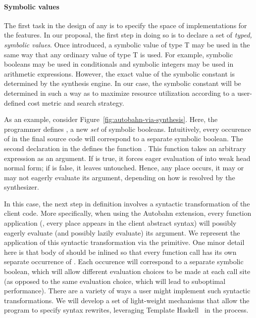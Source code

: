 \paragraph*{Symbolic values}
The first task in the design of any \rasp{} is to specify the space of
implementations for the \rasp{} features.  In our proposal, the first step
in doing so is to declare a set of \emph{typed, symbolic values}.  Once introduced, a symbolic value
of type T may be used in the same way that any ordinary value of type T is used.
For example, symbolic booleans may be used in conditionals and symbolic integers may be used
in arithmetic expressions.  However, the exact value of the symbolic constant is
determined by the synthesis engine.  In our case, the symbolic constant will be determined
in such a way as to maximize resource utilization according to a user-defined cost metric and
search strategy.

As an example, consider Figure~\ref{fig:autobahn-via-synthesis}.  Here, the programmer
defines , a new \emph{set} of symbolic booleans.  Intuitively, every occurence of 
in the final source code will correspond to a separate symbolic boolean.  The second declaration in
the \rasp{} defines the function .  This function takes an arbitrary expression 
as an argument.  If  is true, it forces eager evaluation of  into weak head normal
form; if   is false, it leaves  untouched.  Hence, any
place  occurs, it
may or may not eagerly evaluate its argument, depending on how  is resolved by the
synthesizer.

In this case, the next step in \rasp{} definition involves a syntactic
transformation of the client code.  More specifically, when using the
Autobahn extension, every function application (\ie, every place
 appears in the client abstract syntax) will possibly
eagerly evaluate (and possibly lazily evaluate) its argument.  We
represent the application of this syntactic transformation via the
 primitive.  One minor detail here is that body of
 should be inlined so that every function call has its own
separate occurrence of .  Each occurence will correspond to a
separate symbolic boolean, which will allow different evaluation
choices to be made at each call site (as opposed to the same
evaluation choice, which will lead to suboptimal performance).  There
are a variety of ways a user might implement such syntactic
transformations.  We will develop a set of light-weight mechanisms that
allow the program to specify syntax rewrites, leveraging 
Template Haskell~\cite{template-haskell} in the process.

